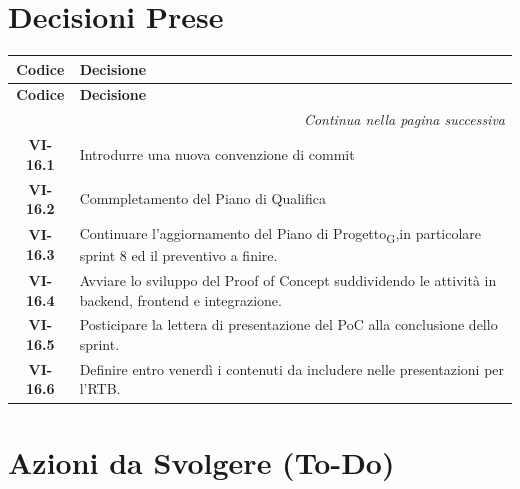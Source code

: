 \section{Decisioni Prese}

\renewcommand{\arraystretch}{1.3}
\vspace{-0.3cm}
\noindent
\begin{longtable}{c p{12cm}}
	\toprule
	\textbf{Codice} & \textbf{Decisione} \\
	\midrule
	\endfirsthead

	\toprule
	\textbf{Codice} & \textbf{Decisione} \\
	\midrule
	\endhead

	\midrule
	\multicolumn{2}{r}{\textit{Continua nella pagina successiva}} \\
	\midrule
	\endfoot

	\bottomrule
	\endlastfoot

	\textbf{VI-16.1} & Introdurre una nuova convenzione di commit \\[4pt]
	\textbf{VI-16.2} & Commpletamento del Piano di Qualifica \\[4pt]
	\textbf{VI-16.3} & Continuare l’aggiornamento del Piano di Progetto\textsubscript{G},in particolare sprint 8 ed il preventivo a finire. \\[4pt]
	\textbf{VI-16.4} & Avviare lo sviluppo del Proof of Concept suddividendo le attività in backend, frontend e integrazione. \\[4pt]
	\textbf{VI-16.5} & Posticipare la lettera di presentazione del PoC alla conclusione dello sprint. \\[4pt]
	\textbf{VI-16.6} & Definire entro venerdì i contenuti da includere nelle presentazioni per l’RTB. \\[4pt]
\end{longtable}

\section{Azioni da Svolgere (To-Do)}

